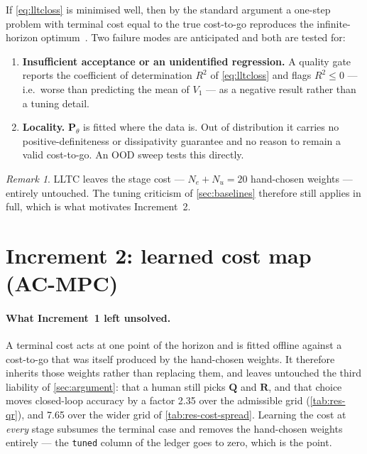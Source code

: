 \documentclass[11pt,a4paper,twoside,openright]{report}
\makeatletter
\renewcommand{\subsection}{\FloatBarrier\old@subsection}}
\newcommand{\vQRratio}{7.65}             %
\newcommand{\mat}[1]{\bm{#1}}
\DeclareRobustCommand{\LLTC}{LLTC}
\theoremstyle{plain}
\theoremstyle{definition}
\theoremstyle{remark}
\newtheorem{remark}[theorem]{Remark}
\makeatother
\begin{document}
	\subsection{Rationale and expected failure modes}

	If \cref{eq:lltcloss} is minimised well, then by the standard argument a
	one-step problem with terminal cost equal to the true cost-to-go reproduces the
	infinite-horizon optimum~\cite{lowrey2019polo}. Two failure modes are anticipated
	and both are tested for:

	\begin{enumerate}[leftmargin=*]
		\item \textbf{Insufficient acceptance or an unidentified regression.} A quality
		gate reports the coefficient of determination $R^2$ of \cref{eq:lltcloss} and
		flags $R^2\le0$ --- i.e.\ worse than predicting the mean of $V_1$ --- as a
		negative result rather than a tuning detail.
		\item \textbf{Locality.} $\mat P_\theta$ is fitted where the data is. Out of
		distribution it carries no positive-definiteness or dissipativity guarantee
		and no reason to remain a valid cost-to-go. An OOD sweep tests this directly.
	\end{enumerate}

	\begin{remark}
		\LLTC{} leaves the stage cost --- $N_e+N_u=20$ hand-chosen weights --- entirely
		untouched. The tuning criticism of \cref{sec:baselines} therefore still applies
		in full, which is what motivates Increment~2.
	\end{remark}

	\section{Increment 2: learned cost map (AC-MPC)}
	\label{sec:acmpc}

	\paragraph{What Increment~1 left unsolved.} A terminal cost acts at one point of
	the horizon and is fitted offline against a cost-to-go that was itself produced
	by the hand-chosen weights. It therefore inherits those weights rather than
	replacing them, and leaves untouched the third liability of
	\cref{sec:argument}: that a human still picks $\mat Q$ and $\mat R$, and that
	choice moves closed-loop accuracy by a factor \num{2.35} over the admissible
	grid (\cref{tab:res-qr}), and \vQRratio{} over the wider grid of
	\cref{tab:res-cost-spread}. Learning the cost at \emph{every} stage subsumes the
	terminal case and removes the hand-chosen weights entirely --- the
	\texttt{tuned} column of the ledger goes to zero, which is the point.
\end{document}
